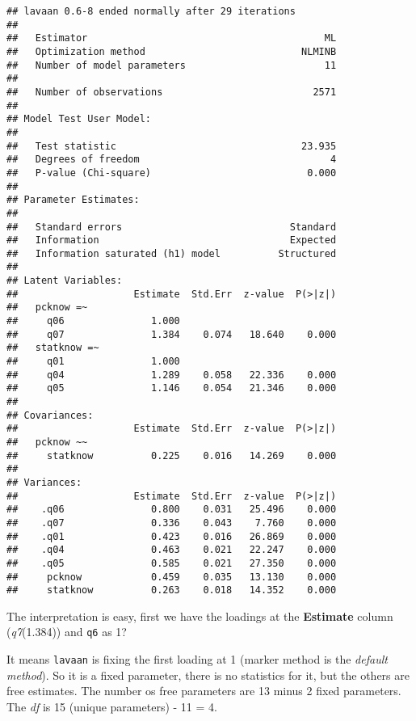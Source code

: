 \documentclass[
]{article}
\begin{document}
\begin{verbatim}
## lavaan 0.6-8 ended normally after 29 iterations
## 
##   Estimator                                         ML
##   Optimization method                           NLMINB
##   Number of model parameters                        11
##                                                       
##   Number of observations                          2571
##                                                       
## Model Test User Model:
##                                                       
##   Test statistic                                23.935
##   Degrees of freedom                                 4
##   P-value (Chi-square)                           0.000
## 
## Parameter Estimates:
## 
##   Standard errors                             Standard
##   Information                                 Expected
##   Information saturated (h1) model          Structured
## 
## Latent Variables:
##                    Estimate  Std.Err  z-value  P(>|z|)
##   pcknow =~                                           
##     q06               1.000                           
##     q07               1.384    0.074   18.640    0.000
##   statknow =~                                         
##     q01               1.000                           
##     q04               1.289    0.058   22.336    0.000
##     q05               1.146    0.054   21.346    0.000
## 
## Covariances:
##                    Estimate  Std.Err  z-value  P(>|z|)
##   pcknow ~~                                           
##     statknow          0.225    0.016   14.269    0.000
## 
## Variances:
##                    Estimate  Std.Err  z-value  P(>|z|)
##    .q06               0.800    0.031   25.496    0.000
##    .q07               0.336    0.043    7.760    0.000
##    .q01               0.423    0.016   26.869    0.000
##    .q04               0.463    0.021   22.247    0.000
##    .q05               0.585    0.021   27.350    0.000
##     pcknow            0.459    0.035   13.130    0.000
##     statknow          0.263    0.018   14.352    0.000
\end{verbatim}

The interpretation is easy, first we have the loadings at the
\textbf{Estimate} column (\emph{q7}(1.384)) and \texttt{q6} as 1?

It means \texttt{lavaan} is fixing the first loading at 1 (marker method
is the \emph{default method}). So it is a fixed parameter, there is no
statistics for it, but the others are free estimates. The number os free
parameters are 13 minus 2 fixed parameters. The \emph{df} is 15 (unique
parameters) - 11 = 4.
\end{document}
